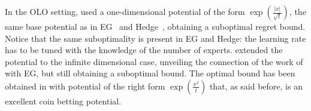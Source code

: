 In the \ac{OLO} setting, \citet{Streeter-McMahan-2012} used a one-dimensional
potential of the form $\exp \left(\tfrac{|x|}{\sqrt{t}}\right)$, the same base
potential as in \ac{EG}~\citep{Kivinen-Warmuth-1997} and Hedge~\cite{Freund-Schapire-1997}, obtaining a suboptimal
regret bound. Notice that the same suboptimality is present in \ac{EG} and Hedge: the learning rate has to be tuned with the
knowledge of the number of experts.
\citet{Orabona-2013} extended the potential to the infinite dimensional case, unveiling the connection of the work of \citet{Streeter-McMahan-2012} with \ac{EG}, but still obtaining a suboptimal bound. The optimal bound has been obtained in
\citet{McMahan-Orabona-2014} with potential of the right form $\exp
\left(\frac{x^2}{t}\right)$ that, as said before, is an excellent coin betting potential.



